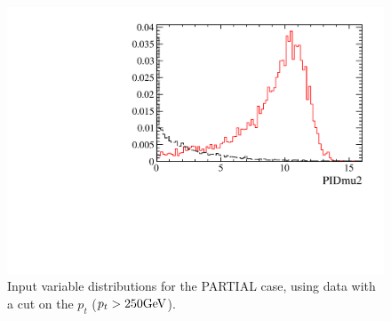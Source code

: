 \documentclass[12pt,a4paper]{article}
\begin{document}
\begin{figure} [htb!]
\begin{center}
\includegraphics[scale=0.20]{figs/PIDmu2PARTIALptcut.pdf}
\caption{Input variable distributions for the PARTIAL case, using \Kspipi data with a cut on the $p_t$ ($p_t > 250 \rm GeV$).
\label{fig:MVAhistos_PARTIAL2pipi2}}
\end{center}
\end{figure}
\end{document}

